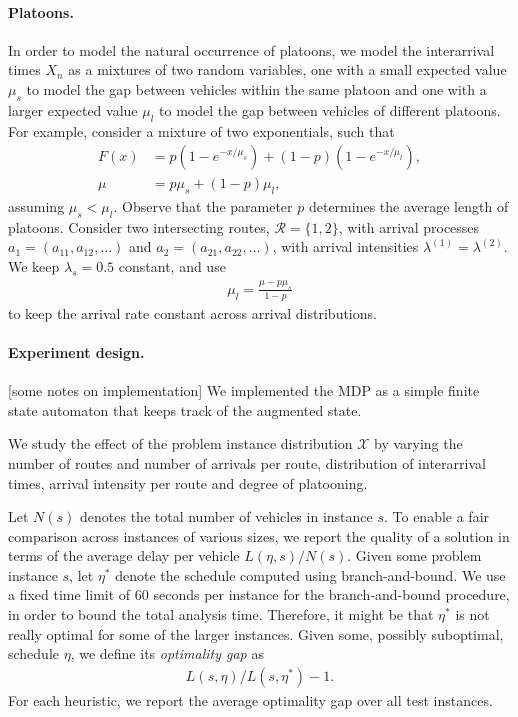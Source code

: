 \documentclass[a4paper]{report}
\theoremstyle{definition}
\theoremstyle{plain}
\newcommand\note[1]{{\color{Navy}#1}}
\begin{document}
\paragraph{Platoons.}
In order to model the natural occurrence of platoons, we model the interarrival
times $X_{n}$ as a mixtures of two random variables, one with a small expected
value $\mu_{s}$ to model the gap between vehicles within the same platoon and one
with a larger expected value $\mu_{l}$ to model the gap between vehicles of
different platoons. For example, consider a mixture of two exponentials, such
that
\begin{align*}
  F(x) &= p ( 1 - e^{-x / \mu_{s}} ) + (1 - p) (1 - e^{-x / \mu_{l}}) , \\[0.2em]
  \mu &= p \mu_{s} + (1-p) \mu_{l} ,
\end{align*}
%
assuming $\mu_{s} < \mu_{l}$. Observe that the parameter $p$ determines
the average length of platoons.
%
Consider two intersecting routes, $\mathcal{R} = \{1, 2\}$, with arrival processes
$a_{1} = (a_{11}, a_{12}, \dots)$ and $a_{2} = (a_{21}, a_{22}, \dots)$, with
arrival intensities $\lambda^{(1)} = \lambda^{(2)}$.
%
We keep $\lambda_{s} = 0.5$ constant, and use
\begin{align*}
  \mu_{l}  = \frac{\mu - p \mu_{s}}{1 - p}
\end{align*}
to keep the arrival rate constant across arrival distributions.


\paragraph{Experiment design.}

\note{[some notes on implementation] We implemented the MDP as a simple finite state automaton that keeps track of
the augmented state.}

We study the effect of the problem instance distribution $\mathcal{X}$ by
varying the number of routes and number of arrivals per route, distribution of
interarrival times, arrival intensity per route and degree of platooning.

Let $N(s)$ denotes the total number of vehicles in instance $s$. To enable a
fair comparison across instances of various sizes, we report the quality of a
solution in terms of the average delay per vehicle $L(\eta, s) / N(s)$.
%
Given some problem instance $s$, let $\eta^{*}$ denote the schedule computed using
branch-and-bound. We use a fixed time limit of 60 seconds per instance for the
branch-and-bound procedure, in order to bound the total analysis time.
Therefore, it might be that $\eta^{*}$ is not really optimal for some of the larger
instances. Given some, possibly suboptimal, schedule $\eta$, we define its \textit{optimality gap}
as
\begin{align*}
  L(s, \eta) / L(s, \eta^{*}) - 1 .
\end{align*}
For each heuristic, we report the average optimality gap over all test
instances.
\end{document}
